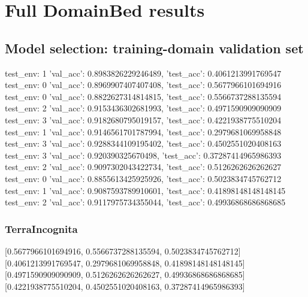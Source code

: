 \documentclass{article}
\begin{document}
\section{Full DomainBed results}

\subsection{Model selection: training-domain validation set}
test_env: 1
{'val_acc': 0.8983826229246489, 'test_acc': 0.4061213991769547}
test_env: 0
{'val_acc': 0.8969907407407408, 'test_acc': 0.5677966101694916}
test_env: 0
{'val_acc': 0.8822627314814815, 'test_acc': 0.5566737288135594}
test_env: 2
{'val_acc': 0.9153436302681993, 'test_acc': 0.4971590909090909}
test_env: 3
{'val_acc': 0.9182680795019157, 'test_acc': 0.4221938775510204}
test_env: 1
{'val_acc': 0.9146561701787994, 'test_acc': 0.2979681069958848}
test_env: 3
{'val_acc': 0.9288344109195402, 'test_acc': 0.4502551020408163}
test_env: 3
{'val_acc': 0.920390325670498, 'test_acc': 0.37287414965986393}
test_env: 2
{'val_acc': 0.9097302043422734, 'test_acc': 0.5126262626262627}
test_env: 0
{'val_acc': 0.8855613425925926, 'test_acc': 0.5023834745762712}
test_env: 1
{'val_acc': 0.9087593789910601, 'test_acc': 0.41898148148148145}
test_env: 2
{'val_acc': 0.9117975734355044, 'test_acc': 0.49936868686868685}

\subsubsection{TerraIncognita}
[0.5677966101694916, 0.5566737288135594, 0.5023834745762712]
[0.4061213991769547, 0.2979681069958848, 0.41898148148148145]
[0.4971590909090909, 0.5126262626262627, 0.49936868686868685]
[0.4221938775510204, 0.4502551020408163, 0.37287414965986393]

\begin{center}
\end{center}
\end{document}
